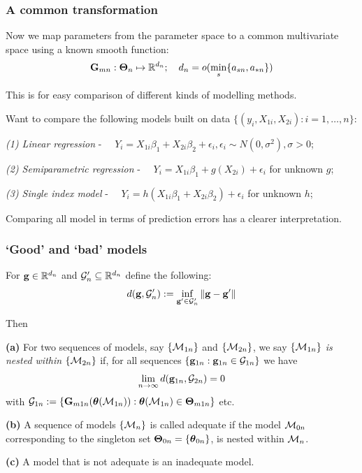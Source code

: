 \documentclass[handout,10pt]{beamer}
\begin{document}
\begin{frame}
\frametitle{A common transformation}
Now we map parameters from the parameter space to a common multivariate space using a known smooth function:
%
$$
{\mathbf{G}}_{m n}: {\boldsymbol{\Theta}}_n \mapsto {\mathbb{R}}^{d_n}; \quad d_n = o ( \min_s \{ a_{s n}, a_{* n} \} )
$$
%

This is for easy comparison of different kinds of modelling methods.

\begin{example} Want to compare the following models built on data $\{ (y_i, X_{1i}, X_{2i}): i = 1, \ldots, n \}$:

\vspace{1em}
\textit{(1) Linear regression} - $\quad Y_i = X_{1 i} \beta_1 + X_{2 i} \beta_2 + \epsilon_i, \epsilon_i \sim N(0, \sigma^2), \sigma > 0$;

\textit{(2) Semiparametric regression} - $\quad Y_i = X_{1 i} \beta_1 + g(X_{2 i}) + \epsilon_i$ for unknown $g$;

\textit{(3) Single index model} - $\quad Y_i = h(X_{1 i} \beta_1 + X_{2 i} \beta_2) + \epsilon_i$ for unknown $h$;

\vspace{1em}
Comparing all model in terms of prediction errors has a clearer interpretation.
\end{example}
\end{frame}

\begin{frame}
\frametitle{`Good' and `bad' models}
For ${\bf{g}} \in {\mathbb{R}}^{d_n}$ and ${\cal{G}}_n' \subseteq {\mathbb{R}}^{d_n}$ define the following:
%
$$ d( {\bf{g}}, {\cal{G}}_n') := \inf_{ {\bf{g}}' \in {\cal{G}}_n'} \| {\bf{g}} - {\bf{g}}' \| $$
%

Then

\vspace{1em}
\noindent\textbf{(a)} For two sequences of models, say $\{ {\cal{M}}_{1n} \}$ and $\{ {\cal{M}}_{2n} \}$, we say \textit{$\{ {\cal{M}}_{1n} \}$ is {\colbit nested within} $\{ {\cal{M}}_{2n} \}$} if, for all sequences $\{ {\bf{g}}_{1n} : {\bf{g}}_{1n} \in {\cal{G}}_{1n} \} $ we have
%
\begin{align*}\label{eq:NestedModelDef}
\lim_{n \rightarrow \infty} d( {\bf{g}}_{1n}, {\cal{G}}_{2n} ) = 0
\end{align*}
%
with ${\cal{G}}_{1 n} := \{ {\mathbf{G}}_{m 1 n} ( {\boldsymbol{\theta}}( {\cal{M}}_{1 n} ) ) : {\boldsymbol{\theta}}( {\cal{M}}_{1 n} ) \in {\boldsymbol{\Theta}}_{m 1 n} \} $ etc.

\vspace{1em}
\noindent\textbf{(b)} A sequence of models $\{ {\cal{M}}_n \}$ is called {\colbit adequate} if the model ${\cal{M}}_{0 n}$ corresponding to the singleton set ${\boldsymbol{\Theta}}_{0 n} = \{ {\boldsymbol{\theta}}_{0 n} \}$, is nested within ${\cal{M}}_n$.

\vspace{1em}
\noindent\textbf{(c) }A model that is not adequate is an {\colbit inadequate model}.

\end{frame}
\end{document}
